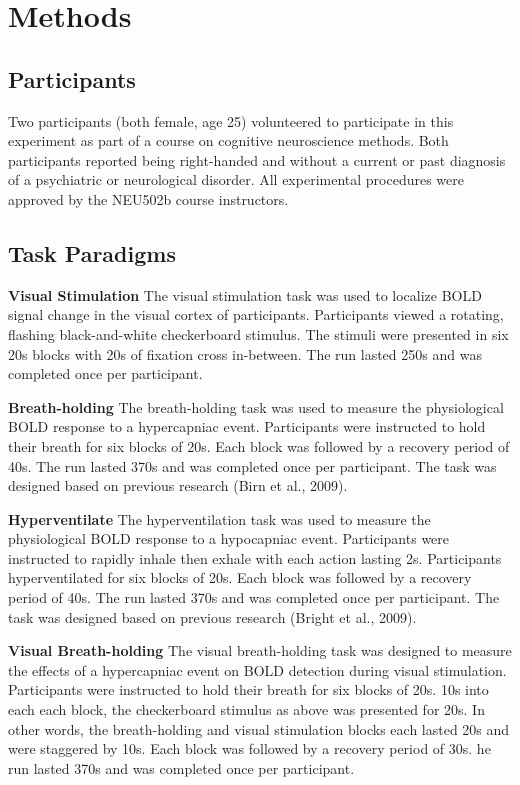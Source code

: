 \documentclass[9pt]{NEU502b-fmri}
\begin{document}
\section{Methods}

\subsection{Participants}
Two participants (both female, age 25) volunteered to participate in this experiment as part of a course on cognitive neuroscience methods. Both participants reported being right-handed and without a current or past diagnosis of a psychiatric or neurological disorder. All experimental procedures were approved by the NEU502b course instructors. 

\subsection{Task Paradigms}

\textbf{Visual Stimulation} The visual stimulation task was used to localize BOLD signal change in the visual cortex of participants. Participants viewed a rotating, flashing black-and-white checkerboard stimulus. The stimuli were presented in six 20s blocks with 20s of fixation cross in-between. The run lasted 250s and was completed once per participant.

\textbf{Breath-holding} The breath-holding task was used to measure the physiological BOLD response to a hypercapniac event. Participants were instructed to hold their breath for six blocks of 20s. Each block was followed by a recovery period of 40s. The run lasted 370s and was completed once per participant. The task was designed based on previous research (Birn et al., 2009). 

\textbf{Hyperventilate} The hyperventilation task was used to measure the physiological BOLD response to a hypocapniac event. Participants were instructed to rapidly inhale then exhale with each action lasting 2s. Participants hyperventilated for six blocks of 20s. Each block was followed by a recovery period of 40s. The run lasted 370s and was completed once per participant. The task was designed based on previous research (Bright et al., 2009). 

\textbf{Visual Breath-holding} The visual breath-holding task was designed to measure the effects of a hypercapniac event on BOLD detection during visual stimulation. Participants were instructed to hold their breath for six blocks of 20s. 10s into each each block, the checkerboard stimulus as above was presented for 20s. In other words, the breath-holding and visual stimulation blocks each lasted 20s and were staggered by 10s. Each block was followed by a recovery period of 30s. he run lasted 370s and was completed once per participant.
\end{document}
